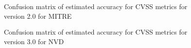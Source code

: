 \documentclass[12pt]{article}
\begin{document}
\begin{figure}[H]
	\centering
	\caption{\label{fig:mitre_2_confusion_matrices}Confusion matrix of estimated accuracy for CVSS
		metrics for version 2.0 for MITRE}
\end{figure}

\begin{figure}[H]
	\centering
	\caption{\label{fig:nvd_30_confusion_matrices}Confusion matrix of estimated accuracy for CVSS metrics for version 3.0 for NVD}
\end{figure}
\end{document}
